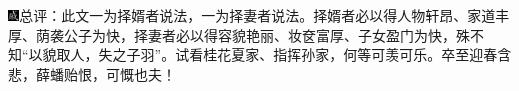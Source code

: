 {\includegraphics[width=3mm]{../Images/00005}\kaishu 总评：此文一为择婿者说法，一为择妻者说法。择婿者必以得人物轩昂、家道丰厚、荫袭公子为快，择妻者必以得容貌艳丽、妆奁富厚、子女盈门为快，殊不知``以貌取人，失之子羽''。试看桂花夏家、指挥孙家，何等可羡可乐。卒至迎春含悲，薛蟠贻恨，可慨也夫！}


